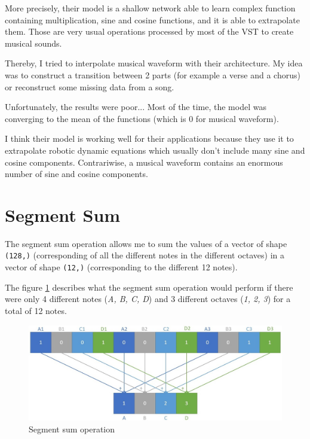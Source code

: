 \documentclass[12pt]{report}
\begin{document}
More precisely, their model is a shallow network able to learn complex function containing multiplication, sine and cosine functions, and it is able to extrapolate them.
Those are very usual operations processed by most of the VST to create musical sounds.

Thereby, I tried to interpolate musical waveform with their architecture.
My idea was to construct a transition between 2 parts (for example a verse and a chorus) or reconstruct some missing data from a song.

Unfortunately, the results were poor...
Most of the time, the model was converging to the mean of the functions (which is 0 for musical waveform).

I think their model is working well for their applications because they use it to extrapolate robotic dynamic equations which usually don't include many sine and cosine components.
Contrariwise, a musical waveform contains an enormous number of sine and cosine components. 


\section{Segment Sum}
\label{appendix:segment_sum}

The segment sum operation allows me to sum the values of a vector of shape \texttt{(128,)} (corresponding of all the different notes in the different octaves) in a vector of shape \texttt{(12,)} (corresponding to the different 12 notes).

The figure \ref{fig:segment_sum} describes what the segment sum operation would perform if there were only 4 different notes (\textit{A, B, C, D}) and 3 different octaves (\textit{1, 2, 3}) for a total of 12 notes.

\begin{figure}[ht]
    \centering
    \includegraphics[width=\textwidth]{images/nn/tensor/segment_sum.jpg}
    \caption{Segment sum operation}
    \label{fig:segment_sum}
\end{figure}
\end{document}
